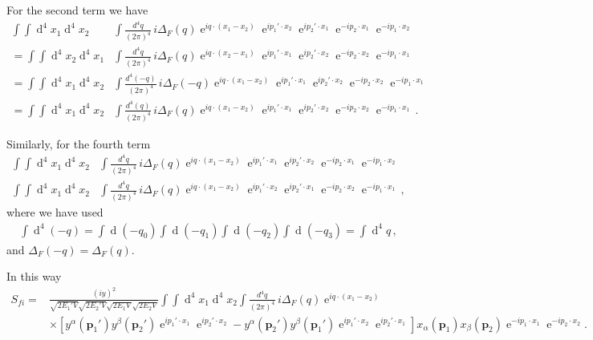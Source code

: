 For the second term  we have
\begin{align}
  \int\int \operatorname{d}^4x_1 \operatorname{d}^4x_2&
\int\frac{d^4q}{(2\pi)^4}\,i\Delta_F(q)\operatorname{e}^{i q\cdot(x_1-x_2)}
\operatorname{e}^{i p_1'\cdot x_2}\operatorname{e}^{i p_2'\cdot x_1}\operatorname{e}^{-i p_2\cdot x_1}\operatorname{e}^{-i p_1\cdot x_2} \nonumber\\
=
  \int\int \operatorname{d}^4x_2 \operatorname{d}^4x_1&
\int\frac{d^4q}{(2\pi)^4}\,i\Delta_F(q)\operatorname{e}^{i q\cdot(x_2-x_1)}
\operatorname{e}^{i p_1'\cdot x_1}\operatorname{e}^{i p_2'\cdot x_2}\operatorname{e}^{-i p_2\cdot x_2}\operatorname{e}^{-i p_1\cdot x_1} \nonumber\\
=
  \int\int \operatorname{d}^4x_1 \operatorname{d}^4x_2&
\int\frac{d^4(-q)}{(2\pi)^4}\,i\Delta_F(-q)\operatorname{e}^{i q\cdot(x_1-x_2)}
\operatorname{e}^{i p_1'\cdot x_1}\operatorname{e}^{i p_2'\cdot x_2}\operatorname{e}^{-i p_2\cdot x_2}\operatorname{e}^{-i p_1\cdot x_1} \nonumber\\
=
  \int\int \operatorname{d}^4x_1 \operatorname{d}^4x_2&
\int\frac{d^4(q)}{(2\pi)^4}\,i\Delta_F(q)\operatorname{e}^{i q\cdot(x_1-x_2)}
\operatorname{e}^{i p_1'\cdot x_1}\operatorname{e}^{i p_2'\cdot x_2}\operatorname{e}^{-i p_2\cdot x_2}\operatorname{e}^{-i p_1\cdot x_1} \,.
\end{align}

Similarly, for the fourth term
\begin{align}
    \int\int \operatorname{d}^4x_1 \operatorname{d}^4x_2&
\int\frac{d^4q}{(2\pi)^4}\,i\Delta_F(q)\operatorname{e}^{i q\cdot(x_1-x_2)}
\operatorname{e}^{i p_1'\cdot x_1}\operatorname{e}^{i p_2'\cdot x_2}\operatorname{e}^{-i p_2\cdot x_1}\operatorname{e}^{-i p_1\cdot x_2} \nonumber\\
    \int\int \operatorname{d}^4x_1 \operatorname{d}^4x_2&
\int\frac{d^4q}{(2\pi)^4}\,i\Delta_F(q)\operatorname{e}^{i q\cdot(x_1-x_2)}
\operatorname{e}^{i p_1'\cdot x_2}\operatorname{e}^{i p_2'\cdot x_1}\operatorname{e}^{-i p_2\cdot x_2}\operatorname{e}^{-i p_1\cdot x_1}\,,
\end{align}
where we have used
\begin{align}
  \int\operatorname{d}^4(-q)=\int\operatorname{d}(-q_0)\int\operatorname{d}(-q_1)\int\operatorname{d}(-q_2)\int\operatorname{d}(-q_3)=\int \operatorname{d}^4q\,,
\end{align}
and $\Delta_F(-q)=\Delta_F(q)$.

In this way
\begin{align}
   S_{fi}
    =&\frac{(iy)^2 }{\sqrt{2 E_1'V}\sqrt{2 E_2'V}\sqrt{2 E_1V}\sqrt{2 E_2V}}\int\int \operatorname{d}^4x_1 \operatorname{d}^4x_2
\int\frac{d^4q}{(2\pi)^4}\,i\Delta_F(q)\operatorname{e}^{i q\cdot(x_1-x_2)} \nonumber\\
&
 \times \left[ y^{\alpha}(\mathbf{p}_1')y^{\beta}(\mathbf{p}_2')\operatorname{e}^{i p_1'\cdot x_1}\operatorname{e}^{i p_2'\cdot x_2}
         - y^{\alpha}(\mathbf{p}_2')y^{\beta}(\mathbf{p}_1')\operatorname{e}^{i p_1'\cdot x_2}\operatorname{e}^{i p_2'\cdot x_1} 
  \right]x_{\alpha}(\mathbf{p}_1)x_{\beta}(\mathbf{p}_2)\operatorname{e}^{-i p_1\cdot x_1}\operatorname{e}^{-i p_2\cdot x_2}.
\end{align}

